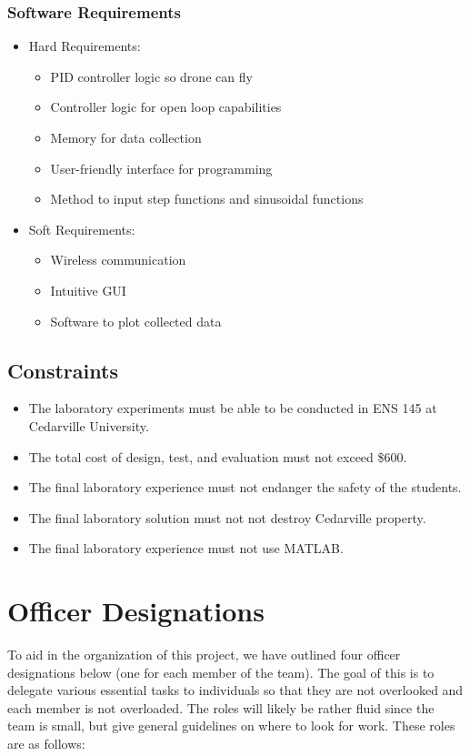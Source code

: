 \documentclass[12pt, titlepage]{article}
\begin{document}
\subsubsection{Software Requirements}
\begin{itemize}
  \item[$\Rightarrow$] Hard Requirements:
  \begin{itemize}
    \item PID controller logic so drone can fly
    \item Controller logic for open loop capabilities
    \item Memory for data collection
    \item User-friendly interface for programming
    \item Method to input step functions and sinusoidal functions
  \end{itemize}
  \item[$\Rightarrow$] Soft Requirements:
  \begin{itemize}
    \item Wireless communication
    \item Intuitive GUI
    \item Software to plot collected data
  \end{itemize}
\end{itemize}
\subsection{Constraints}
\begin{itemize}
  \item The laboratory experiments must be able to be conducted in ENS 145 at Cedarville University.
  \item The total cost of design, test, and evaluation must not exceed \$600.
  \item The final laboratory experience must not endanger the safety of the students.
  \item The final laboratory solution must not not destroy Cedarville property.
  \item The final laboratory experience must not use MATLAB.
\end{itemize}

\newpage
\section{Officer Designations}
To aid in the organization of this project, we have outlined four officer designations below (one for each member of the team). The goal of this is to delegate various essential tasks to individuals so that they are not overlooked and each member is not overloaded. The roles will likely be rather fluid since the team is small, but give general guidelines on where to look for work. These roles are as follows: \\
\end{document}
